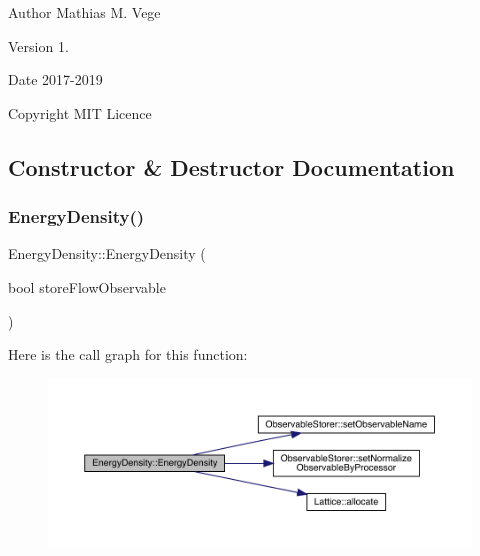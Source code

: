 \begin{DoxyAuthor}{Author}
Mathias M. Vege 
\end{DoxyAuthor}
\begin{DoxyVersion}{Version}
1. 
\end{DoxyVersion}
\begin{DoxyDate}{Date}
2017-\/2019 
\end{DoxyDate}
\begin{DoxyCopyright}{Copyright}
M\+IT Licence 
\end{DoxyCopyright}


\subsection{Constructor \& Destructor Documentation}
\mbox{\label{class_energy_density_a1d23cfe5690c9daf8b2f0ec8f6471c5f}} 
\subsubsection{\texorpdfstring{EnergyDensity()}{EnergyDensity()}}
{\footnotesize\ttfamily Energy\+Density\+::\+Energy\+Density (\begin{DoxyParamCaption}\item[{bool}]{store\+Flow\+Observable }\end{DoxyParamCaption})}

Here is the call graph for this function\+:\nopagebreak
\begin{figure}[H]
\begin{center}
\leavevmode
\includegraphics[width=350pt]{class_energy_density_a1d23cfe5690c9daf8b2f0ec8f6471c5f_cgraph}
\end{center}
\end{figure}
\mbox{\label{class_energy_density_a307e031858ac7149f5689911f8ff22fb}} 
